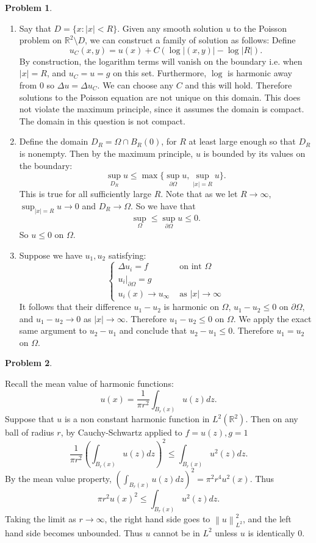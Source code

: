 \documentclass[12pt, a4paper]{article}
\newtheorem{problem}{Problem}
\theoremstyle{definition}
\newcommand{\penum}{ \begin{enumerate}[label=\bf(\alph*), leftmargin=0pt]}
\newcommand{\epenum}{ \end{enumerate} }
\newcommand{\R}{\mathbb{R}}                           %
\newcommand{\bd}{\partial}
\newcommand{\norm}[1]{\left\lVert#1\right\rVert}
\begin{document}
\newpage
\begin{problem}
\end{problem}
\penum
\item Say that $D = \{x: |x|<R\}$. Given any smooth solution $u$ to the Poisson problem on $\R^2 \setminus D$, we can construct a family of solution as follows: Define $$u_C(x,y) = u(x) + C(\log|(x,y)|- \log|R|).$$
By construction, the logarithm terms will vanish on the boundary i.e. when $|x| = R$, and $u_C = u = g$ on this set. Furthermore, $\log$ is harmonic away from $0$ so $\Delta u = \Delta u_C$. We can choose any $C$ and this will hold. Therefore solutions to the Poisson equation are not unique on this domain. This does not violate the maximum principle, since it assumes the domain is compact. The domain in this question is not compact. 
\item Define the domain $D_R = \Omega \cap B_R(0)$, for $R$ at least large enough so that $D_R$ is nonempty. Then by the maximum principle, $u$ is bounded by its values on the boundary: 
$$\sup_{D_R}u \leq \max \{\sup_{\bd \Omega} u , \sup_{|x| = R} u\}.$$
This is true for all sufficiently large $R$. Note that as we let $R\to \infty$, $\sup_{|x| = R} u \to 0$ and $D_R \to \Omega$. So we have that $$\sup_{\Omega} \leq \sup_{\bd \Omega} u \leq 0.$$
So $u\leq 0$ on $\Omega$. 
\item 
Suppose we have $u_1,u_2$ satisfying:
$$\begin{cases}
\Delta u_i = f & \text{ on int $\Omega$}
\\ u_i|_{\bd \Omega} = g 
\\ u_i(x) \to u_\infty & \text{ as $|x|\to \infty$} 
\end{cases}$$
It follows that their difference $u_1 - u_2$ is harmonic on $\Omega$, $u_1 - u_2 \leq0$ on $\bd \Omega$, and $u_1 - u_2 \to 0$ as $|x| \to \infty$. Therefore $u_1- u_2 \leq 0$ on $\Omega$. We apply the exact same argument to $u_2 - u_1$ and conclude that $u_2 - u_1 \leq 0$. Therefore $u_1 = u_2$ on $\Omega$. 
\epenum
\newpage
\begin{problem}
\end{problem}
Recall the mean value of harmonic functions: 
$$u(x) = \frac{1}{\pi r^2} \int_{B_r(x)} u(z)dz.$$
Suppose that $u$ is a non constant harmonic function in $L^2(\R^2)$. Then on any ball of radius $r$, by Cauchy-Schwartz applied to $f= u(z), g = 1$
$$\frac{1}{\pi r^2}\left( \int_{B_r(x)} u(z)dz\right)^2 \leq \int_{B_r(x)} u^2(z)dz.$$
By the mean value property, $\left( \int_{B_r(x)} u(z)dz\right)^2 = \pi^2 r^4 u^2(x).$ Thus
$$\pi r^2 u(x)^2 \leq \int_{B_r(x)} u^2(z)dz.$$
Taking the limit as $r\to \infty$, the right hand side goes to $\norm{u}^2_{L^2}$, and the left hand side becomes unbounded. Thus $u$ cannot be in $L^2$ unless $u$ is identically $0$. 
\end{document}
